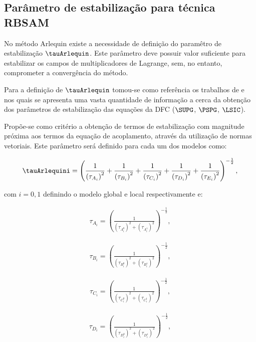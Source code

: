 \subsection{Parâmetro de estabilização para técnica RBSAM}

No método Arlequin existe a necessidade de definição do paramêtro de estabilização $\tauArlequin$. Este parâmetro deve possuir valor suficiente para estabilizar os campos de multiplicadores de Lagrange, sem, no entanto, comprometer a convergência do método. 

Para a definição de $\tauArlequin$ tomou-se como referência os trabalhos de  e  nos quais se apresenta uma vasta quantidade de informação a cerca da obtenção dos parâmetros de estabilização das equações da DFC ($\SUPG$, $\PSPG$, $\LSIC$). 

Propõe-se como critério a obtenção de termos de estabilização com magnitude próxima aos termos da equação de acoplamento, através da utilização de normas vetoriais. Este parâmetro será definido para cada um dos modelos como:

\begin{align}
	\tauArlequini = \left(\frac{1}{\left(\tau_{A_i}\right)^{2}} + \frac{1}{\left(\tau_{B_i}\right)^{2}} +  \frac{1}{\left(\tau_{C_i}\right)^{2}} + 
	\frac{1}{\left(\tau_{D_i}\right)^{2}} +
	\frac{1}{\left(\tau_{E_i}\right)^{2}}
	\right)^{-\frac{1}{2}},
\end{align}

\noindent com $i=0,1$ definindo o modelo global e local respectivamente e:

\begin{align}
	\tau_{A_{i}} = \left(\frac{1}{\left(\tau_{A_i^{0}}\right)^{2} + \left(\tau_{A_i^{1}}\right)^{2}} \right)^{-\frac{1}{2}}, \label{eq:tAi}
\end{align}

\begin{align}
	\tau_{B_{i}} = \left(\frac{1}{\left(\tau_{B_i^{0}}\right)^{2} + \left(\tau_{B_i^{1}}\right)^{2}} \right)^{-\frac{1}{2}},
\end{align}

\begin{align}
	\tau_{C_{i}} = \left(\frac{1}{\left(\tau_{C_i^{0}}\right)^{2} + \left(\tau_{C_i^{1}}\right)^{2}} \right)^{-\frac{1}{2}},
\end{align}

\begin{align}
	\tau_{D_{i}} = \left(\frac{1}{\left(\tau_{D_i^{0}}\right)^{2} + \left(\tau_{D_i^{1}}\right)^{2}} \right)^{-\frac{1}{2}},
\end{align}

